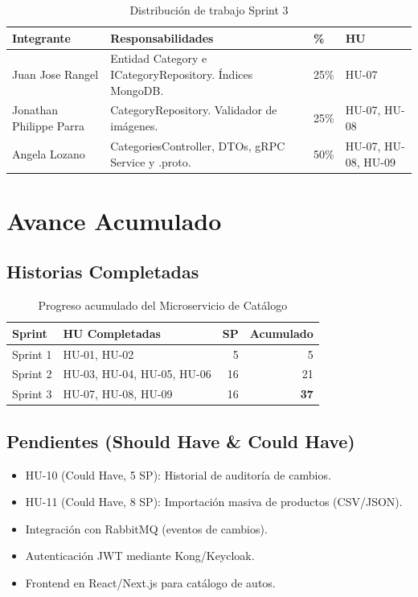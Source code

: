 \documentclass[12pt,a4paper]{article}
\begin{document}
\begin{table}[H]\centering
\begin{tabularx}{\textwidth}{l X l l}
\toprule\rowcolor{lightblue}
\textbf{Integrante} & \textbf{Responsabilidades} & \textbf{\%} & \textbf{HU}\\
\midrule
Juan Jose Rangel &
Entidad Category e ICategoryRepository. Índices MongoDB. &
25\% & HU-07\\
\rowcolor{lightgray}
Jonathan Philippe Parra &
CategoryRepository. Validador de imágenes. &
25\% & HU-07, HU-08\\
Angela Lozano &
CategoriesController, DTOs, gRPC Service y .proto. &
50\% & HU-07, HU-08, HU-09\\
\bottomrule
\end{tabularx}
\caption{Distribuci\'on de trabajo Sprint 3}
\end{table}

\newpage

\section{Avance Acumulado}

\subsection{Historias Completadas}

\begin{table}[H]\centering
\begin{tabular}{l l r r}
\toprule\rowcolor{lightblue}
\textbf{Sprint} & \textbf{HU Completadas} & \textbf{SP} & \textbf{Acumulado}\\
\midrule
Sprint 1 & HU-01, HU-02 & 5 & 5\\
\rowcolor{lightgray}
Sprint 2 & HU-03, HU-04, HU-05, HU-06 & 16 & 21\\
Sprint 3 & HU-07, HU-08, HU-09 & 16 & \textbf{37}\\
\bottomrule
\end{tabular}
\caption{Progreso acumulado del Microservicio de Cat\'alogo}
\end{table}

\subsection{Pendientes (Should Have \& Could Have)}

\begin{itemize}[leftmargin=1.5em]
  \item HU-10 (Could Have, 5 SP): Historial de auditor\'ia de cambios.
  \item HU-11 (Could Have, 8 SP): Importaci\'on masiva de productos (CSV/JSON).
  \item Integraci\'on con RabbitMQ (eventos de cambios).
  \item Autenticaci\'on JWT mediante Kong/Keycloak.
  \item Frontend en React/Next.js para cat\'alogo de autos.
\end{itemize}
\end{document}
